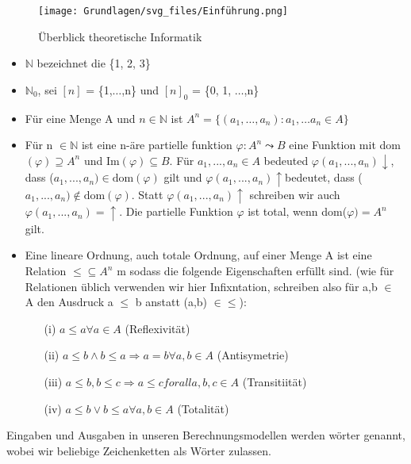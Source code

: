 \begin{figure}
    \centering
    \texttt{[image: Grundlagen/svg\_files/Einführung.png]}
    \caption{Überblick theoretische Informatik}
    \label{fig:example}
\end{figure}
\begin{itemize}
    \item \(\mathbb{N}\) bezeichnet die \{1, 2, 3\}
    \item \(\mathbb{N}_{0}\), sei \([n]\) = \{1,\(\ldots \),n\} und \([n]_{0}\) = \{0, 1, \(\ldots \),n\} 
    \item Für eine Menge A und \(n \in \mathbb{N}\) ist \(A^{n} = \{(a_{1},\ldots, a_{n}): a_{1}, \ldots a_{n}\in A\}\)
    \item Für n \(\in \mathbb{N}\) ist eine n-äre partielle funktion \(\varphi : A^{n} \leadsto B \) eine Funktion mit dom\((\varphi) \supseteq A^{n}\) und Im\((\varphi) \subseteq B.\) 
    Für \(a_{1}, ..., a_{n} \in A\) bedeuted \(\varphi(a_{1}, ..., a_{n})\downarrow\), dass (\(a_{1}, ..., a_{n})\in \text{dom}(\varphi)\) gilt und \(\varphi(a_{1}, ..., a_{n})\uparrow \)bedeutet, 
    dass (\(a_{1}, ..., a_{n}) \notin \text{dom}(\varphi)\). Statt \(\varphi(a_{1}, ..., a_{n})\uparrow\) schreiben wir auch \(\varphi(a_{1}, ..., a_{n}) = \uparrow\).
    Die partielle Funktion \(\varphi\) ist total, wenn dom(\(\varphi) = A^{n}\) gilt.
    \item Eine lineare Ordnung, auch totale Ordnung, auf einer Menge A ist eine Relation \(\leq  \subseteq  A^{n}\) m sodass die folgende Eigenschaften erfüllt sind. 
    (wie für Relationen üblich verwenden wir hier Infixntation, schreiben also für a,b \(\in\) A den Ausdruck a \(\leq\)  b anstatt (a,b) \(\in \leq\)): 
    \begin{enumerate}
        \item[(i)] \(a \leq  a \forall a \in A\) (Reflexivität)
        \item[(ii)]\( a \leq  b  \land  b \leq  a \Rightarrow  a = b \forall a,b \in A\) (Antisymetrie)
        \item[(iii)] \(a \leq  b, b \leq  c \Rightarrow a \leq  c foralla,b,c \in A\) (Transitiität)
        \item[(iv)] \(a \leq  b \vee b \leq  a \forall a,b \in A\) (Totalität)
    \end{enumerate} 
\end{itemize}

    Eingaben und Ausgaben in unseren Berechnungsmodellen werden wörter genannt, wobei wir beliebige Zeichenketten als Wörter zulassen.

